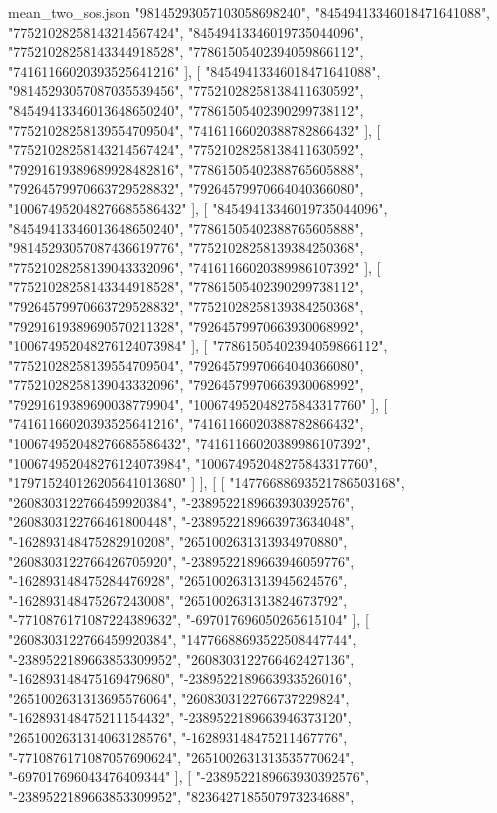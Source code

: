 \begin{filecontents*}[overwrite]{mean_two_sos.json}
    "98145293057103058698240",
    "84549413346018471641088",
    "77521028258143214567424",
    "84549413346019735044096",
    "77521028258143344918528",
    "77861505402394059866112",
    "74161166020393525641216"
   ],
   [
    "84549413346018471641088",
    "98145293057087035539456",
    "77521028258138411630592",
    "84549413346013648650240",
    "77861505402390299738112",
    "77521028258139554709504",
    "74161166020388782866432"
   ],
   [
    "77521028258143214567424",
    "77521028258138411630592",
    "79291619389689928482816",
    "77861505402388765605888",
    "79264579970663729528832",
    "79264579970664040366080",
    "100674952048276685586432"
   ],
   [
    "84549413346019735044096",
    "84549413346013648650240",
    "77861505402388765605888",
    "98145293057087436619776",
    "77521028258139384250368",
    "77521028258139043332096",
    "74161166020389986107392"
   ],
   [
    "77521028258143344918528",
    "77861505402390299738112",
    "79264579970663729528832",
    "77521028258139384250368",
    "79291619389690570211328",
    "79264579970663930068992",
    "100674952048276124073984"
   ],
   [
    "77861505402394059866112",
    "77521028258139554709504",
    "79264579970664040366080",
    "77521028258139043332096",
    "79264579970663930068992",
    "79291619389690038779904",
    "100674952048275843317760"
   ],
   [
    "74161166020393525641216",
    "74161166020388782866432",
    "100674952048276685586432",
    "74161166020389986107392",
    "100674952048276124073984",
    "100674952048275843317760",
    "179715240126205641013680"
   ]
  ],
  [
   [
    "14776688693521786503168",
    "2608303122766459920384",
    "-2389522189663930392576",
    "2608303122766461800448",
    "-2389522189663973634048",
    "-162893148475282910208",
    "2651002631313934970880",
    "2608303122766426705920",
    "-2389522189663946059776",
    "-162893148475284476928",
    "2651002631313945624576",
    "-162893148475267243008",
    "2651002631313824673792",
    "-7710876171087224389632",
    "-697017696050265615104"
   ],
   [
    "2608303122766459920384",
    "14776688693522508447744",
    "-2389522189663853309952",
    "2608303122766462427136",
    "-162893148475169479680",
    "-2389522189663933526016",
    "2651002631313695576064",
    "2608303122766737229824",
    "-162893148475211154432",
    "-2389522189663946373120",
    "2651002631314063128576",
    "-162893148475211467776",
    "-7710876171087057690624",
    "2651002631313535770624",
    "-697017696043476409344"
   ],
   [
    "-2389522189663930392576",
    "-2389522189663853309952",
    "8236427185507973234688",

\end{filecontents*}

